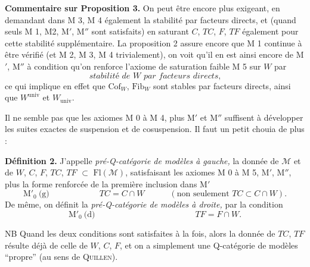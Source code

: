 \documentclass[11pt]{article}
\newcommand{\printedpage}[1]{\marginpar{\footnotesize p.~#1}}
\newcommand{\msp}[1]{\marginpar{\footnotesize [#1]}}
\newcommand{\cM}{\mathcal{M}}
\newcommand{\Fl}{\mathrm{Fl}}
\newcommand{\Cof}{\mathrm{Cof}}
\newcommand{\Fib}{\mathrm{Fib}}
\begin{document}
\textbf{Commentaire sur Proposition 3.} On peut être encore plus exigeant, en demandant dans M 3, M 4 également la stabilité par facteurs directs, et (quand seuls M 1, M2, M$'$, M$''$ %
sont satisfaits) en saturant $C$, $TC$, $F$, $TF$ également pour cette stabilité supplémentaire. La proposition 2 assure encore que M 1 continue à être vérifié (et M 2, M 3, M 4 trivialement), on voit qu'il en est ainsi encore de M$'$, M$''$ à condition qu'on renforce l'axiome de saturation faible M 5 sur $W$ par
\[
\textit{stabilité de $W$ par facteurs directs,}
\]
ce qui implique en effet que $\Cof_W$, $\Fib_W$ sont stables par facteurs directs, ainsi que $W^{\mathrm{univ}}$ et $W_{\mathrm{univ}}$.

\msp{page 12}Il ne semble pas que les axiomes M 0 à M 4, plus M$'$ et M$''$ suffisent à développer les suites exactes de suspension et de cosuspension. Il faut un petit chouia de plus :

\printedpage{8}
\textbf{Définition 2.} J'appelle \textit{pré-Q-catégorie de modèles à gauche,} la donnée de $\cM$ et de $W$, $C$, $F$, $TC$, $TF$ $\subset$ $\Fl(\cM)$, satisfaisant les axiomes M 0 à M 5, M$'$, M$''$, plus la forme renforcée de la première inclusion dans M$'$
\[
\text{M}'_0\ \text{(g)}\qquad\qquad\qquad TC=C\cap W\qquad\quad(\text{non seulement } TC\subset C\cap W).
\]
De même, on définit la \textit{pré-Q-catégorie de modèles à droite,} par la condition
\[
\text{M}'_0\ \text{(d)}\qquad\qquad\qquad\qquad\qquad\qquad TF=F\cap W.
\]

NB Quand les deux conditions sont satisfaites à la fois, alors la donnée de $TC$, $TF$ résulte déjà de celle de $W$, $C$, $F$, et on a simplement une Q-catégorie de modèles “propre” (au sens de \textsc{Quillen}).
\end{document}
